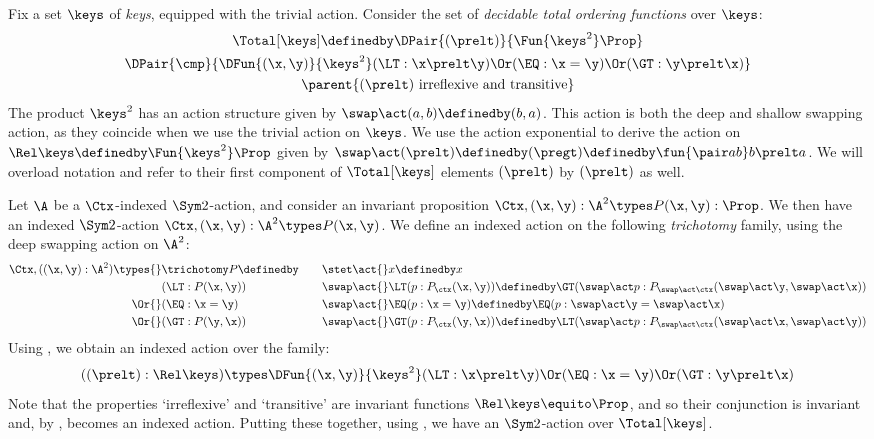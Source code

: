 Fix a set $\keys$ of \emph{keys}, equipped with the trivial action.
Consider the set of \emph{decidable
total ordering functions} over $\keys$:
\begin{multline*}
\Total[\keys] \definedby
\DPair{(\prelt)}{\Fun{\keys^2}\Prop}\\
\DPair{\cmp}{\DFun{(\x,\y)}{\keys^2}
  (\LT : \x \prelt \y) \Or (\EQ : \x = \y) \Or (\GT : \y \prelt \x)}
\\\parent{(\prelt) \text{ irreflexive and transitive}}
\end{multline*}
The product $\keys^2$ has an action structure given by $\swap \act
(a,b) \definedby (b,a)$. This action is both the deep and shallow
swapping action, as they coincide when we use the trivial action on
$\keys$. We use the action exponential to derive the action on
$\Rel\keys \definedby \Fun{\keys^2}\Prop$ given by $\swap \act
(\prelt) \definedby (\pregt) \definedby \fun{\pair ab} b \prelt a$.
We will overload notation and refer to their first component of
$\Total[\keys]$ elements $(\prelt)$ by $(\prelt)$ as well.

Let $\A$ be a $\Ctx$-indexed $\Sym 2$-action, and consider an
invariant proposition $\Ctx, (\x,\y) : \A^2 \types P(\x,\y) :
\Prop$. We then have an indexed $\Sym 2$-action $\Ctx, (\x,\y) : \A^2
\types P(\x,\y)$.  We define an indexed action on the following
\emph{trichotomy} family, using the deep swapping action on $\A^2$:
\begin{gather*}
  \begin{aligned}[t]
    \Ctx,((\x,\y) : \A^2)\types{}
    & \trichotomy P \definedby \\
    & (\LT : P(\x,\y)) \\
    \Or {}& (\EQ : \x = \y) \\
    \Or {}& (\GT : P(\y,\x))
  \end{aligned}
\qquad
\begin{aligned}[t]
    \stet \act{}& x \definedby x
    \\
    \swap \act{}& \LT (p : P_{\ctx}(\x,\y)) \definedby
    \GT (\swap \act p : P_{\swap\act\ctx}(\swap \act \y, \swap \act \x))
    \\
    \swap \act{}& \EQ (p : \x = \y) \definedby
    \EQ (p : \swap \act \y = \swap \act \x)
    \\
    \swap \act{}& \GT (p : P_{\ctx}(\y,\x)) \definedby
    \LT (\swap \act p : P_{\swap\act\ctx}(\swap \act \x, \swap \act \y))
  \end{aligned}
\end{gather*}
Using , we obtain an indexed action
over the family:
\[
((\prelt) : \Rel\keys)\types
\DFun{(\x,\y)}{\keys^2}(\LT : \x \prelt \y) \Or (\EQ : \x = \y)
\Or (\GT : \y \prelt \x)
\]
Note that the properties `irreflexive' and `transitive' are invariant
functions $\Rel\keys \equito \Prop$, and so their conjunction is
invariant and, by , becomes an
indexed action. Putting these together, using , we have an $\Sym2$-action over $\Total[\keys]$.

